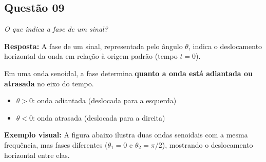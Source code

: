 \subsection*{Questão 09}

\textit{O que indica a fase de um sinal?}\par

\textbf{Resposta:} 
A fase de um sinal, representada pelo ângulo \(\theta\), indica o deslocamento horizontal da onda em relação à origem padrão (tempo \(t=0\)).

Em uma onda senoidal, a fase determina \textbf{quanto a onda está adiantada ou atrasada} no eixo do tempo.
\begin{itemize}
    \item $\theta > 0$: onda adiantada (deslocada para a esquerda)
    \item $\theta < 0$: onda atrasada (deslocada para a direita)
\end{itemize}

\textbf{Exemplo visual: } 
A figura abaixo ilustra duas ondas senoidais com a mesma frequência, mas fases diferentes ($\theta_1=0$ e $\theta_2=\pi/2$), mostrando o deslocamento horizontal entre elas.

\begin{center}
\end{center}